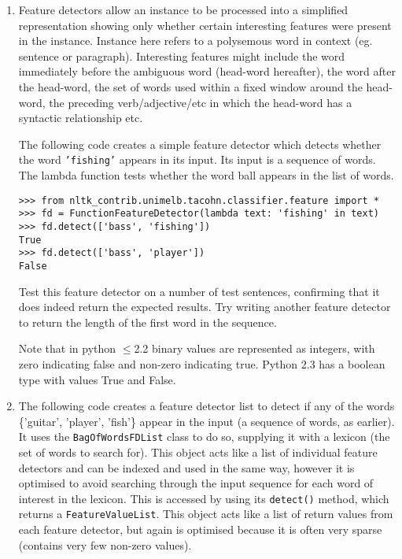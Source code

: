 \documentclass{worksheet}
\begin{document}
\begin{enumerate}
\item Feature detectors allow an instance to be processed into a simplified
representation showing only whether certain interesting features were present
in the instance. Instance here refers to a polysemous word in context (eg.
sentence or paragraph). Interesting features might include the word
immediately before the ambiguous word (head-word hereafter), the word after
the head-word, the set of words used within a fixed window around the
head-word, the preceding verb/adjective/etc in which the head-word has a
syntactic relationship etc.

The following code creates a simple feature detector which detects whether
the word \texttt{'fishing'} appears in its input. Its input is a sequence of
words. The lambda function tests whether the word ball appears in the list of
words.

\begin{verbatim}
>>> from nltk_contrib.unimelb.tacohn.classifier.feature import *
>>> fd = FunctionFeatureDetector(lambda text: 'fishing' in text)
>>> fd.detect(['bass', 'fishing'])
True
>>> fd.detect(['bass', 'player'])
False
\end{verbatim}

Test this feature detector on a number of test sentences, confirming that it
does indeed return the expected results. Try writing another feature detector
to return the length of the first word in the sequence.

Note that in python $\le$2.2 binary values are represented as integers, with
zero indicating false and non-zero indicating true. Python 2.3 has a boolean
type with values True and False. 

\item The following code creates a feature detector list to detect if any of
the words \{'guitar', 'player', 'fish'\} appear in the input (a sequence of
words, as earlier). It uses the \texttt{BagOfWordsFDList} class to do so,
supplying it with a lexicon (the set of words to search for). This object
acts like a list of individual feature detectors and can be indexed and used
in the same way, however it is optimised to avoid searching through the input
sequence for each word of interest in the lexicon. This is accessed by using
its \texttt{detect()} method, which returns a \texttt{FeatureValueList}. This
object acts like a list of return values from each feature detector, but
again is optimised because it is often very sparse (contains very few
non-zero values).


\end{enumerate}
\end{document}
